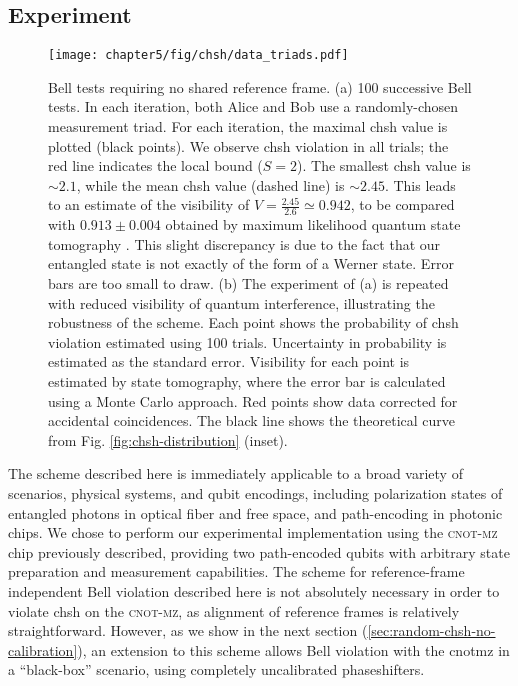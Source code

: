 \subsection{Experiment} 

\begin{figure}[!t]
\centering
\texttt{[image: chapter5/fig/chsh/data\_triads.pdf]}
\caption[Bell tests using random measurement triads: experimental results]{ Bell tests requiring no shared reference frame. (a) 100 successive Bell tests. In each iteration, both Alice and Bob use a randomly-chosen measurement triad. For each iteration, the maximal \gls{chsh} value is plotted (black points). We observe \gls{chsh} violation in all trials; the red line indicates the local bound ($S=2$). The smallest \gls{chsh} value is $\sim 2.1$, while the mean \gls{chsh} value (dashed line) is $\sim 2.45$. This leads to an estimate of the visibility of $V=\frac{2.45}{2.6}\simeq 0.942$, to be compared with $0.913\pm0.004$ obtained by maximum likelihood quantum state tomography \cite{James2001}. This slight discrepancy is due to the fact that our entangled state is not exactly of the form of a Werner state. Error bars are too small to draw. (b) The experiment of (a) is repeated with reduced visibility of quantum interference, illustrating the robustness of the scheme. Each point shows the probability of \gls{chsh} violation estimated using 100 trials. Uncertainty in probability is estimated as the standard error.  Visibility for each point is estimated by state tomography, where the error bar is calculated using a Monte Carlo approach. Red points show data corrected for accidental coincidences. The black line shows the theoretical curve from Fig. \ref{fig:chsh-distribution} (inset). \label{fig:chsh-triads-expt}}
\end{figure}

The scheme described here is immediately applicable to a broad variety of scenarios, physical systems, and qubit encodings, including polarization states of entangled photons in optical fiber and free space, and path-encoding in photonic chips. We chose to perform our experimental implementation using the \textsc{cnot-mz} chip previously described, providing two path-encoded qubits with arbitrary state preparation and measurement capabilities. The scheme for reference-frame independent Bell violation described here is not absolutely necessary in order to violate \gls{chsh} on the \textsc{cnot-mz}, as alignment of reference frames is relatively straightforward. However, as we show in the next section (\ref{sec:random-chsh-no-calibration}), an extension to this scheme allows Bell violation with the \acrshort{cnotmz} in a ``black-box'' scenario, using completely uncalibrated phaseshifters.

